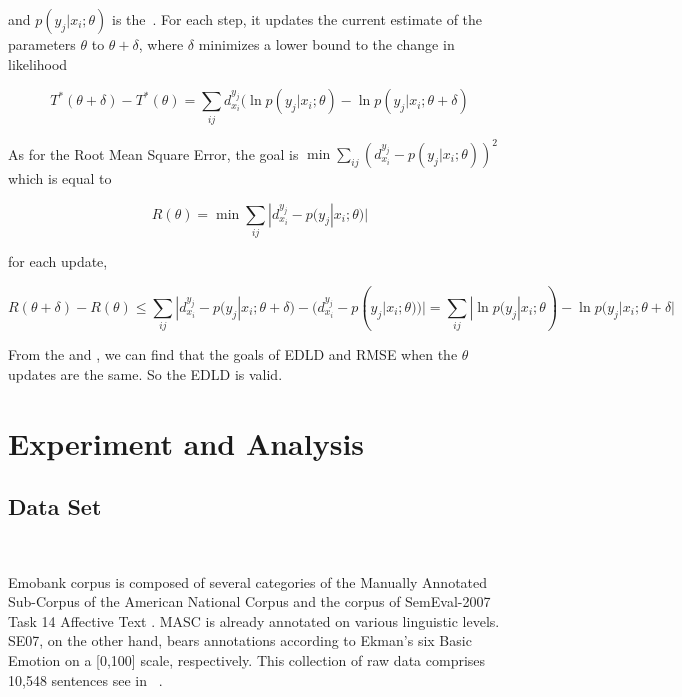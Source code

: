 and $ p( y_{ j } | x_{ i } ;{\theta}) $ is the~. 
For each step, 
it updates the current estimate of the parameters 
\textbf{$\theta$} to \textbf{ $\theta + \delta$},
where \textbf{$ \delta $} minimizes a lower bound to the change in likelihood

\begin{equation}\label{eq:update}
T^{\ast}(\theta + \delta) - T^{\ast}(\theta) =
\sum\limits_{ij} d^{y_{j}}_{ x_{ i } } ( \ln p(y_{j}|x_{i};{\theta}) - \ln p(y_{j}|x_{i};{\theta +\delta})
\end{equation}

As for the Root Mean Square Error,
the goal is 
$ \mathop{\min}\sum\limits_{ij} ( d^{y_{j}}_{ x_{ i } } -  p(y_{j}|x_{i};{\theta}))^{2}$
which is equal to

\begin{equation}\label{eq:rmse}
	R(\theta) = \mathop{\min} \sum\limits_{ij}
	|d^{y_{j}}_{ x_{ i } } -  p(y_{j}|x_{i};{\theta})|
\end{equation}

for each update,

\begin{equation}\label{eq:rmse'}
	R(\theta + \delta) - R(\theta) \leq 
	\sum\limits_{ij} |
	d^{y_{j}}_{ x_{ i } }  - 
	p(y_{j}|x_{i};{\theta + \delta}) - 
	(d^{y_{j}}_{ x_{ i } }  - 
	p(y_{j}|x_{i};{\theta})) | =
	\sum\limits_{ij}
	|  \ln p(y_{j}|x_{i};{\theta}) - \ln p(y_{j}|x_{i};{\theta +\delta} |
\end{equation}

From the  and , 
we can find that the goals of EDLD and  RMSE
when the $ \theta $ updates are the same.
So the EDLD is valid.
   


\section{Experiment and Analysis} \label{sec-experiment}

\subsection{Data Set}
\

Emobank corpus 
\cite{buechel-hahn-2017-emobank}
is composed of 
several categories of 
the Manually Annotated Sub-Corpus of the American National Corpus 
and the corpus of SemEval-2007 Task 14 Affective Text
\cite{Buechel2016}. 
MASC is already annotated on various linguistic levels. 
SE07, on the other hand, bears annotations according to 
Ekman’s six Basic Emotion on a [0,100] scale, respectively. 
This collection of raw data comprises 10,548 sentences see in ~.

